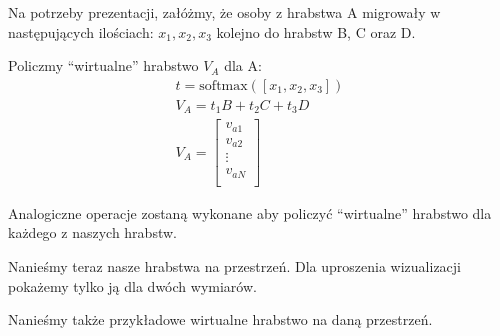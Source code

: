 \documentclass[a4paper,12pt]{article}
\newcommand{\softmax}{\mathrm{softmax}}
\begin{document}
Na potrzeby prezentacji, załóżmy, że osoby z hrabstwa A migrowały w następujących ilościach: $x_1, x_2, x_3$ kolejno do hrabstw B, C oraz D.

Policzmy ``wirtualne'' hrabstwo $V_A$ dla A:
\begin{equation}
    \begin{gathered}
        t = \softmax ([x_1, x_2, x_3]) \\
        V_A = t_1B + t_2C + t_3D \\
        V_A = \begin{bmatrix}
            v_{a1} \\
            v_{a2} \\
            \vdots \\
            v_{aN} \\
        \end{bmatrix}
    \end{gathered}
\end{equation}

Analogiczne operacje zostaną wykonane aby policzyć ``wirtualne'' hrabstwo dla każdego z naszych hrabstw.

Nanieśmy teraz nasze hrabstwa na przestrzeń. Dla uproszenia wizualizacji pokażemy tylko ją dla dwóch wymiarów.

\begin{center}
\end{center}

Nanieśmy także przykładowe wirtualne hrabstwo na daną przestrzeń. 
\end{document}
